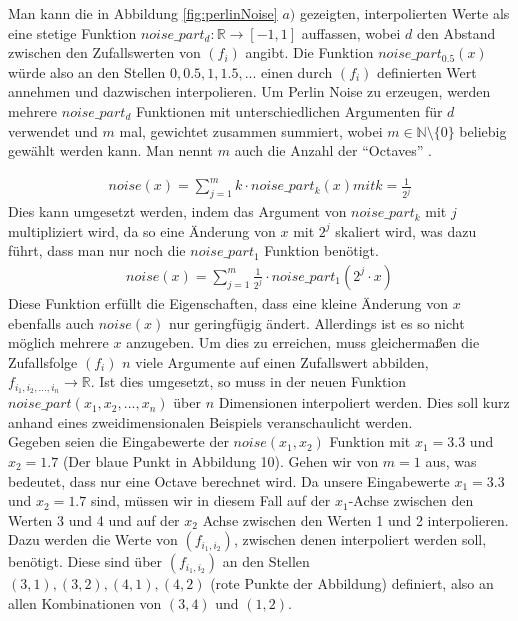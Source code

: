 \documentclass[11pt,a4paper]{article}
\begin{document}
\noindent
Man kann die in Abbildung \ref{fig:perlinNoise} $a)$ gezeigten, interpolierten Werte als eine stetige Funktion $noise\_part_d\colon \mathbb{R} \rightarrow [-1, 1]$ auffassen, wobei $d$ den Abstand zwischen den Zufallswerten von $(f_i)$ angibt. Die Funktion $noise\_part_{0.5}(x)$ würde also an den Stellen $0, 0.5, 1, 1.5, ...$ einen durch $(f_i)$ definierten Wert annehmen und dazwischen interpolieren. Um Perlin Noise zu erzeugen, werden mehrere $noise\_part_d$ Funktionen mit unterschiedlichen Argumenten für $d$ verwendet und $m$ mal, gewichtet zusammen summiert, wobei $m \in \mathbb{N}\setminus\{0\}$ beliebig gewählt werden kann. Man nennt $m$ auch die Anzahl der ``Octaves'' \cite[Kap. Introduction]{nature_of_code}.

\begin{align}
noise(x) = \sum^{m}_{j=1} k \cdot noise\_part_{k}(x) mit k = \frac{1}{2^j}
\end{align}
\noindent
Dies kann umgesetzt werden, indem das Argument von $noise\_part_k$ mit $j$ multipliziert wird, da so eine Änderung von $x$ mit $2^j$ skaliert wird, was dazu führt, dass man nur noch die $noise\_part_1$ Funktion benötigt.
\begin{align}
noise(x) = \sum^{m}_{j=1}  \frac{1}{2^j} \cdot noise\_part_1(2^j \cdot x)
\end{align}
\noindent
Diese Funktion erfüllt die Eigenschaften, dass eine kleine Änderung von $x$ ebenfalls auch $noise(x)$ nur geringfügig ändert. Allerdings ist es so nicht möglich mehrere $x$ anzugeben. Um dies zu erreichen, muss gleichermaßen die Zufallsfolge $(f_i)$ $n$ viele Argumente auf einen Zufallswert abbilden, $f_{i_1, i_2, ..., i_n} \rightarrow \mathbb{R}$. Ist dies umgesetzt, so muss in der neuen Funktion $noise\_part(x_1, x_2, ..., x_n)$ über $n$ Dimensionen interpoliert werden. Dies soll kurz anhand eines zweidimensionalen Beispiels veranschaulicht werden.\\
Gegeben seien die Eingabewerte der $noise(x_1, x_2)$ Funktion mit $x_1=3.3$ und $x_2 = 1.7$ (Der blaue Punkt in Abbildung 10). Gehen wir von $m = 1$ aus, was bedeutet, dass nur eine Octave berechnet wird. Da unsere Eingabewerte $x_1 = 3.3$ und $x_2 = 1.7$ sind, müssen wir in diesem Fall auf der $x_1$-Achse zwischen den Werten 3 und 4 und auf der $x_2$ Achse zwischen den Werten 1 und 2 interpolieren. Dazu werden die Werte von $(f_{i_1, i_2})$, zwischen denen interpoliert werden soll, benötigt. Diese sind über $(f_{i_1, i_2})$ an den Stellen $(3, 1), (3, 2), (4, 1), (4, 2)$ (rote Punkte der Abbildung) definiert, also an allen Kombinationen von $(3,4)$ und $(1,2)$.\\
\end{document}
